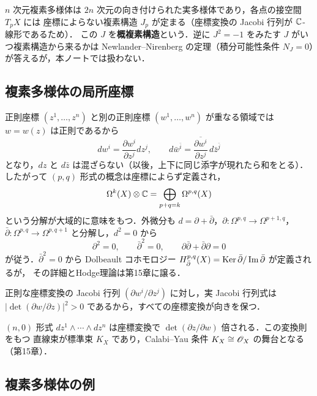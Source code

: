 $n$ 次元複素多様体は $2n$ 次元の向き付けられた実多様体であり，各点の接空間 $T_pX$ には
座標によらない複素構造 $J_p$ が定まる（座標変換の Jacobi 行列が $\mathbb{C}$-線形であるため）．
この $J$ を\textbf{概複素構造}という．逆に $J^2=-1$ をみたす $J$ がいつ複素構造から来るかは
Newlander--Nirenberg の定理（積分可能性条件 $N_J=0$）が答えるが，本ノートでは扱わない．

\subsection{複素多様体の局所座標}

正則座標 $(z^1,\dots,z^n)$ と別の正則座標 $(w^1,\dots,w^n)$ が重なる領域では $w=w(z)$ は正則であるから
\begin{equation}
  dw^i = \frac{\partial w^i}{\partial z^j}dz^j,\qquad d\bar w^{\bar i} = \overline{\frac{\partial w^i}{\partial z^j}}\,d\bar z^{\bar j}
\end{equation}
となり，$dz$ と $d\bar z$ は混ざらない（以後，上下に同じ添字が現れたら和をとる）．
したがって $(p,q)$ 形式の概念は座標によらず定義され，
\begin{equation}
  \Omega^k(X)\otimes\mathbb{C} = \bigoplus_{p+q=k}\Omega^{p,q}(X)
\end{equation}
という分解が大域的に意味をもつ．外微分も $d=\partial+\bar\partial$，$\partial:\Omega^{p,q}\to\Omega^{p+1,q}$，
$\bar\partial:\Omega^{p,q}\to\Omega^{p,q+1}$ と分解し，$d^2=0$ から
\begin{equation}
  \partial^2=0,\qquad \bar\partial^2 = 0,\qquad \partial\bar\partial+\bar\partial\partial=0
\end{equation}
が従う．$\bar\partial^2=0$ から Dolbeault コホモロジー $H^{p,q}_{\bar\partial}(X)=\operatorname{Ker}\bar\partial/\operatorname{Im}\bar\partial$ が定義されるが，
その詳細とHodge理論は第15章に譲る．

正則な座標変換の Jacobi 行列 $(\partial w^i/\partial z^j)$ に対し，実 Jacobi 行列式は
$|\det(\partial w/\partial z)|^2>0$ であるから，すべての座標変換が向きを保つ．
\begin{note}
$(n,0)$ 形式 $dz^1\wedge\cdots\wedge dz^n$ は座標変換で $\det(\partial z/\partial w)$ 倍される．この変換則をもつ
直線束が標準束 $K_X$ であり，Calabi--Yau 条件 $K_X\cong\mathscr{O}_X$ の舞台となる（第15章）．
\end{note}

\subsection{複素多様体の例}

